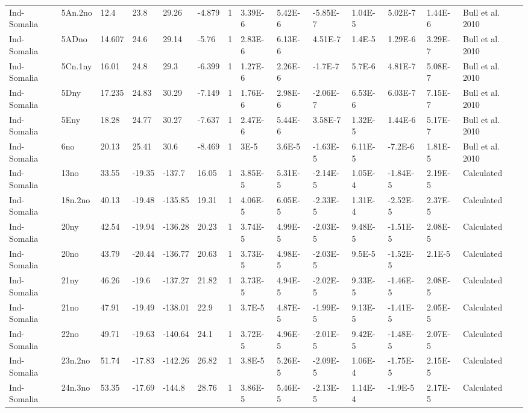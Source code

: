 \begin{landscape}
\begin{longtable}{@{}lllllllllllllp{3.5cm}@{}}
Ind-Somalia & 5An.2no & 12.4 & 23.8 & 29.26 & -4.879 & 1 & 3.39E-6 & 5.42E-6 & -5.85E-7 & 1.04E-5 & 5.02E-7 & 1.44E-6 & Bull et al. 2010 \\
Ind-Somalia & 5ADno & 14.607 & 24.6 & 29.14 & -5.76 & 1 & 2.83E-6 & 6.13E-6 & 4.51E-7 & 1.4E-5 & 1.29E-6 & 3.29E-7 & Bull et al. 2010 \\
Ind-Somalia & 5Cn.1ny & 16.01 & 24.8 & 29.3 & -6.399 & 1 & 1.27E-6 & 2.26E-6 & -1.7E-7 & 5.7E-6 & 4.81E-7 & 5.08E-7 & Bull et al. 2010 \\
Ind-Somalia & 5Dny & 17.235 & 24.83 & 30.29 & -7.149 & 1 & 1.76E-6 & 2.98E-6 & -2.06E-7 & 6.53E-6 & 6.03E-7 & 7.15E-7 & Bull et al. 2010 \\
Ind-Somalia & 5Eny & 18.28 & 24.77 & 30.27 & -7.637 & 1 & 2.47E-6 & 5.44E-6 & 3.58E-7 & 1.32E-5 & 1.44E-6 & 5.17E-7 & Bull et al. 2010 \\
Ind-Somalia & 6no & 20.13 & 25.41 & 30.6 & -8.469 & 1 & 3E-5 & 3.6E-5 & -1.63E-5 & 6.11E-5 & -7.2E-6 & 1.81E-5 & Bull et al. 2010 \\
Ind-Somalia & 13no & 33.55 & -19.35 & -137.7 & 16.05 & 1 & 3.85E-5 & 5.31E-5 & -2.14E-5 & 1.05E-4 & -1.84E-5 & 2.19E-5 & Calculated \\
Ind-Somalia & 18n.2no & 40.13 & -19.48 & -135.85 & 19.31 & 1 & 4.06E-5 & 6.05E-5 & -2.33E-5 & 1.31E-4 & -2.52E-5 & 2.37E-5 & Calculated \\
Ind-Somalia & 20ny & 42.54 & -19.94 & -136.28 & 20.23 & 1 & 3.74E-5 & 4.99E-5 & -2.03E-5 & 9.48E-5 & -1.51E-5 & 2.08E-5 & Calculated \\
Ind-Somalia & 20no & 43.79 & -20.44 & -136.77 & 20.63 & 1 & 3.73E-5 & 4.98E-5 & -2.03E-5 & 9.5E-5 & -1.52E-5 & 2.1E-5 & Calculated \\
Ind-Somalia & 21ny & 46.26 & -19.6 & -137.27 & 21.82 & 1 & 3.73E-5 & 4.94E-5 & -2.02E-5 & 9.33E-5 & -1.46E-5 & 2.08E-5 & Calculated \\
Ind-Somalia & 21no & 47.91 & -19.49 & -138.01 & 22.9 & 1 & 3.7E-5 & 4.87E-5 & -1.99E-5 & 9.13E-5 & -1.41E-5 & 2.05E-5 & Calculated \\
Ind-Somalia & 22no & 49.71 & -19.63 & -140.64 & 24.1 & 1 & 3.72E-5 & 4.96E-5 & -2.01E-5 & 9.42E-5 & -1.48E-5 & 2.07E-5 & Calculated \\
Ind-Somalia & 23n.2no & 51.74 & -17.83 & -142.26 & 26.82 & 1 & 3.8E-5 & 5.26E-5 & -2.09E-5 & 1.06E-4 & -1.75E-5 & 2.15E-5 & Calculated \\
Ind-Somalia & 24n.3no & 53.35 & -17.69 & -144.8 & 28.76 & 1 & 3.86E-5 & 5.46E-5 & -2.13E-5 & 1.14E-4 & -1.9E-5 & 2.17E-5 & Calculated \\

\end{longtable}
\end{landscape}
